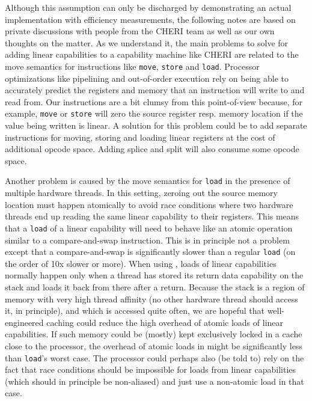 \documentclass[acmsmall,review,showframe]{acmart}\settopmatter{printfolios=true,printccs=false,printacmref=false}
\begin{document}
Although this assumption can only be discharged by demonstrating an actual implementation with efficiency measurements, the following notes are based on private discussions with people from the CHERI team as well as our own thoughts on the matter.
As we understand it, the main problems to solve for adding linear capabilities to a capability machine like CHERI are related to the move semantics for instructions like \texttt{move}, \texttt{store} and \texttt{load}.
Processor optimizations like pipelining and out-of-order execution rely on being able to accurately predict the registers and memory that an instruction will write to and read from.
Our instructions are a bit clumsy from this point-of-view because, for example, \texttt{move} or \texttt{store} will zero the source register resp. memory location if the value being written is linear.
A solution for this problem could be to add separate instructions for moving, storing and loading linear registers at the cost of additional opcode space.
Adding splice and split will also consume some opcode space.

Another problem is caused by the move semantics for \texttt{load} in the presence of multiple hardware threads.
In this setting, zeroing out the source memory location must happen atomically to avoid race conditions where two hardware threads end up reading the same linear capability to their registers.
This means that a \texttt{load} of a linear capability will need to behave like an atomic operation similar to a compare-and-swap instruction.
This is in principle not a problem except that a compare-and-swap is significantly slower than a regular \texttt{load} (on the order of 10x slower or more).
When using \stktokens{}, loads of linear capabilities normally happen only when a thread has stored its return data capability on the stack and loads it back from there after a return.
Because the stack is a region of memory with very high thread affinity (no other hardware thread should access it, in principle), and which is accessed quite often, we are hopeful that well-engineered caching could reduce the high overhead of atomic loads of linear capabilities.
If such memory could be (mostly) kept exclusively locked in a cache close to the processor, the overhead of atomic loads in \stktokens{} might be significantly less than \texttt{load}'s worst case.
The processor could perhaps also (be told to) rely on the fact that race conditions should be impossible for loads from linear capabilities (which should in principle be non-aliased) and just use a non-atomic load in that case.
\end{document}
